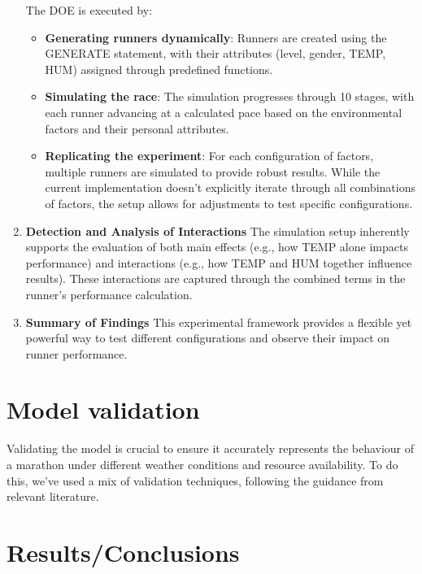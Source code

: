 \documentclass[conference]{IEEEtran}
\begin{document}
\begin{enumerate}
    The DOE is executed by:
    \begin{itemize}
        \item \textbf{Generating runners dynamically}: Runners are created using the GENERATE statement, with their attributes (level, gender, TEMP, HUM) assigned through predefined functions.
        \item \textbf{Simulating the race}: The simulation progresses through 10 stages, with each runner advancing at a calculated pace based on the environmental factors and their personal attributes.
        \item \textbf{Replicating the experiment}: For each configuration of factors, multiple runners are simulated to provide robust results. While the current implementation doesn't explicitly iterate through all combinations of factors, the setup allows for adjustments to test specific configurations.
    \end{itemize}
    \item \textbf{Detection and Analysis of Interactions}
    The simulation setup inherently supports the evaluation of both main effects (e.g., how TEMP alone impacts performance) and interactions (e.g., how TEMP and HUM together influence results). These interactions are captured through the combined terms in the runner’s performance calculation.
    \item \textbf{Summary of Findings}
    This experimental framework provides a flexible yet powerful way to test different configurations and observe their impact on runner performance.
\end{enumerate}
\section{Model validation}
Validating the model is crucial to ensure it accurately represents the behaviour of a marathon under different weather conditions and resource availability. To do this, we’ve used a mix of validation techniques, following the guidance from relevant literature.

\section{Results/Conclusions}
\end{document}
